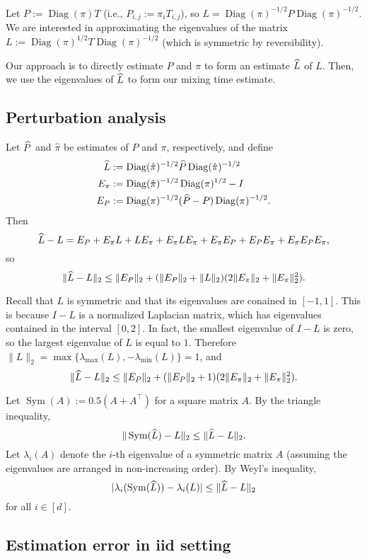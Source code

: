 \documentclass[11pt]{article}
\theoremstyle{plain}
\theoremstyle{definition}
\theoremstyle{remark}
\newcommand\wh{\ensuremath{\widehat}}
\newcommand\norm[1]{\| #1 \|}
\DeclareMathOperator{\Diag}{Diag}
\DeclareMathOperator{\Sym}{Sym}
\renewcommand\t{{\ensuremath{\scriptscriptstyle{\top}}}}
\begin{document}
Let $P := \Diag(\pi) T$ (i.e., $P_{i,j} := \pi_i T_{i,j}$), so $L =
\Diag(\pi)^{-1/2} P \Diag(\pi)^{-1/2}$.
We are interested in approximating the eigenvalues of the matrix $L :=
\Diag(\pi)^{1/2} T \Diag(\pi)^{-1/2}$ (which is symmetric by
reversibility).

Our approach is to directly estimate $P$ and $\pi$ to form an estimate
$\wh{L}$ of $L$.
Then, we use the eigenvalues of $\wh{L}$ to form our mixing time
estimate.

\subsection{Perturbation analysis}

Let $\wh{P}$ and $\hat\pi$ be estimates of $P$ and $\pi$,
respectively, and define
\begin{align*}
  \wh{L} & := \Diag(\hat\pi)^{-1/2} \wh{P} \Diag(\hat\pi)^{-1/2} \\
  E_\pi & := \Diag(\hat\pi)^{-1/2} \Diag(\pi)^{1/2} - I \\
  E_P & := \Diag(\pi)^{-1/2} (\wh{P} - P) \Diag(\pi)^{-1/2} .
\end{align*}
Then
\[
  \wh{L} - L
  = E_P + E_\pi L + L E_\pi + E_\pi L E_\pi + E_\pi E_P + E_P E_\pi +
  E_\pi E_P E_\pi
  ,
\]
so
\[
  \norm{\wh{L} - L}_2
  \leq \norm{E_P}_2 + (\norm{E_P}_2 + \norm{L}_2)
  (2\norm{E_\pi}_2 + \norm{E_\pi}_2^2)
  .
\]

Recall that $L$ is symmetric and that its eigenvalues are conained in
$[-1,1]$.
This is because $I - L$ is a normalized Laplacian matrix, which has
eigenvalues contained in the interval $[0,2]$.
In fact, the smallest eigenvalue of $I - L$ is zero, so the largest
eigenvalue of $L$ is equal to $1$.
Therefore $\norm{L}_2 = \max\{\lambda_{\max}(L),-\lambda_{\min}(L)\} =
1$, and
\[
  \norm{\wh{L} - L}_2
  \leq \norm{E_P}_2 + (\norm{E_P}_2 + 1)
  (2\norm{E_\pi}_2 + \norm{E_\pi}_2^2)
  .
\]

Let $\Sym(A) := 0.5 (A + A^\t)$ for a square matrix $A$.
By the triangle inequality,
\[
  \norm{\Sym(\wh{L}) - L}_2
  \leq \norm{\wh{L} - L}_2 .
\]
Let $\lambda_i(A)$ denote the $i$-th eigenvalue of a symmetric matrix
$A$ (assuming the eigenvalues are arranged in non-increasing order).
By Weyl's inequality,
\[
  |\lambda_i(\Sym(\wh{L})) - \lambda_i(L)| \leq
  \norm{\wh{L} - L}_2
\]
for all $i\in[d]$.

\subsection{Estimation error in iid setting}
\end{document}
